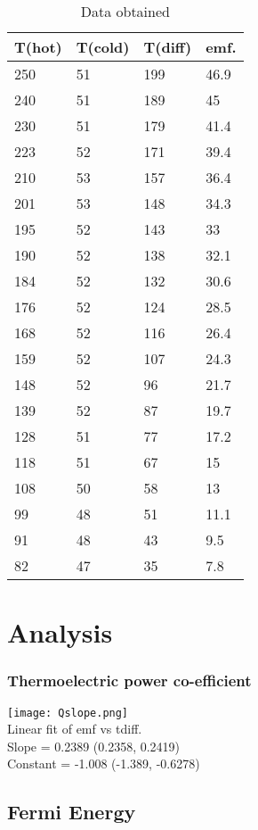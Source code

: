 \documentclass{article}
\begin{document}
\begin{table}[]
    \centering
    \begin{tabular}{|p{3cm}|p{3cm}||p{3cm}|p{3cm}|}
    \hline
    T(hot) & T(cold) & T(diff) & emf. \\
    \hline
250 & 51 & 199 & 46.9 \\
240 & 51 & 189 & 45 \\
230 & 51 & 179 & 41.4 \\
223 & 52 & 171 & 39.4 \\
210 & 53 & 157 & 36.4 \\
201 & 53 & 148 & 34.3 \\
195 & 52 & 143 & 33 \\
190 & 52 & 138 & 32.1 \\
184 & 52 & 132 & 30.6 \\
176 & 52 & 124 & 28.5 \\
168 & 52 & 116 & 26.4 \\
159 & 52 & 107 & 24.3 \\
148 & 52 & 96 & 21.7 \\
139 & 52 & 87 & 19.7 \\
128 & 51 & 77 & 17.2 \\
118 & 51 & 67 & 15 \\
108 & 50 & 58 & 13 \\
99 & 48 & 51 & 11.1 \\
91 & 48 & 43 & 9.5 \\
82 & 47 & 35 & 7.8 \\
\hline
    \end{tabular}
    \caption{Data obtained}
    \label{tab:my_label}
\end{table}



\section{Analysis}

\subsubsection{Thermoelectric power co-efficient}

\texttt{[image: Qslope.png]}
\\
Linear fit of emf vs tdiff.
\\
Slope =      0.2389  (0.2358, 0.2419)
\\
Constant =  -1.008  (-1.389, -0.6278)

\subsection{Fermi Energy}
\end{document}
